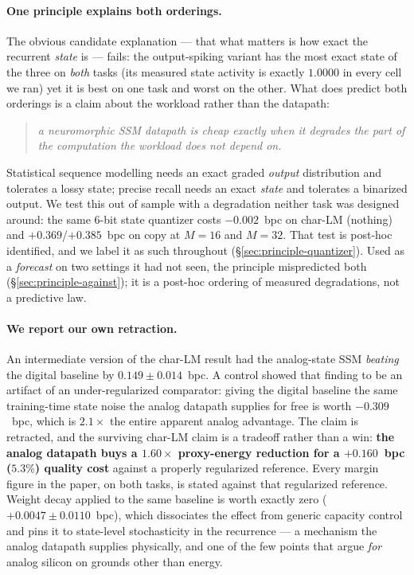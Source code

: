 \paragraph{One principle explains both orderings.} The obvious candidate explanation --- that what
matters is how exact the recurrent \emph{state} is --- fails: the output-spiking variant has the
most exact state of the three on \emph{both} tasks (its measured state activity is exactly
$1.0000$ in every cell we ran) yet it is best on one task and worst on the other. What does
predict both orderings is a claim about the workload rather than the datapath:
\begin{quote}
\emph{a neuromorphic SSM datapath is cheap exactly when it degrades the part of the computation
the workload does not depend on.}
\end{quote}
Statistical sequence modelling needs an exact graded \emph{output} distribution and tolerates a
lossy state; precise recall needs an exact \emph{state} and tolerates a binarized output. We test
this out of sample with a degradation neither task was designed around: the same 6-bit state
quantizer costs $-0.002$~bpc on char-LM (nothing) and $+0.369$/$+0.385$~bpc on copy at $M{=}16$
and $M{=}32$. That test is post-hoc identified, and we label it as such throughout
(\S\ref{sec:principle-quantizer}). Used as a \emph{forecast} on two settings it had not
seen, the principle mispredicted both (\S\ref{sec:principle-against}); it is a post-hoc
ordering of measured degradations, not a predictive law.

\paragraph{We report our own retraction.} An intermediate version of the char-LM result had the
analog-state SSM \emph{beating} the digital baseline by $0.149\pm0.014$~bpc. A control showed that
finding to be an artifact of an under-regularized comparator: giving the digital baseline the same
training-time state noise the analog datapath supplies for free is worth $-0.309$~bpc, which is
$2.1\times$ the entire apparent analog advantage. The claim is retracted, and the surviving
char-LM claim is a tradeoff rather than a win: \textbf{the analog datapath buys a $1.60\times$
proxy-energy reduction for a $+0.160$~bpc ($5.3\%$) quality cost} against a properly regularized
reference. Every margin figure in the paper, on both tasks, is stated against that regularized
reference. Weight decay applied to the same baseline is worth exactly zero
($+0.0047\pm0.0110$~bpc), which dissociates the effect from generic capacity control and pins it
to state-level stochasticity in the recurrence --- a mechanism the analog datapath supplies
physically, and one of the few points that argue \emph{for} analog silicon on grounds other than
energy.

